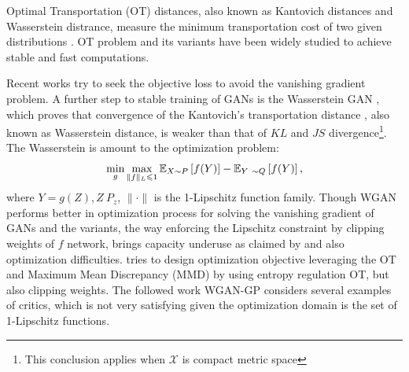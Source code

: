 \begin{remark}
Optimal Transportation (OT) distances, also known as Kantovich distances
and Wasserstein distrance, measure the minimum transportation cost of
two given distributions \cite{villani2003topics}. OT problem and its
variants have been widely studied to achieve stable and fast computations\cite{2013arXiv1310.4375C}\cite{2013arXiv1306.0895C}\cite{2016arXiv161006519S}\cite{DBLP:conf/icml/ClaiciCS18}.

Recent works try to seek the objective loss to avoid the vanishing
gradient problem.
A further step to stable training of GANs is the Wasserstein GAN
\cite{2017arXiv170107875A}, which proves that convergence of the
Kantovich's transportation distance \cite{villani2003topics}, also
known as Wasserstein distance, is weaker than that of $KL$ and $JS$ divergence\footnote{This conclusion applies when
  $\mathcal{X}$ is compact metric space}. The
Wasserstein is amount to the optimization problem:
\begin{equation}\label{eq-wgan}
  \min_{g} \max_{\|f\|_{L} \leqslant 1} \mathbb{E}_{X \sim P}\left[ f(Y) \right] -
  \mathbb{E}_{Y~\sim Q}\left[ f(Y) \right],
\end{equation}
where $Y=g(Z), Z~P_z$, $\|\cdot\|$ is the 1-Lipschitz function
family. Though WGAN performs better in optimization process for
solving the vanishing gradient of GANs and the variants, the way 
\cite{2017arXiv170107875A} enforcing the Lipschitz constraint by
clipping weights of $f$ network, brings capacity
underuse as claimed by and also optimization
difficulties\cite{2017arXiv170400028G}. \cite{pmlr-v84-genevay18a}
tries to design optimization objective leveraging the OT and Maximum
Mean Discrepancy (MMD) by
using entropy regulation OT, but also clipping weights. 
The followed work WGAN-GP \cite{2017arXiv170400028G} considers several examples of critics, which is not very satisfying given the optimization domain is the set of 1-Lipschitz functions.
\end{remark}

